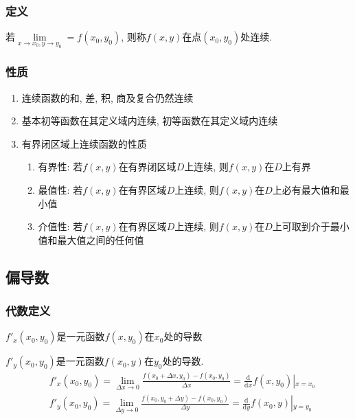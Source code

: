 \subsubsection{定义}
若$ \lim\limits_{x \rightarrow x_{0}, y\rightarrow y_{0}}=f(x_{0},y_{0}) $, 则称$ f(x,y) $在点$ (x_{0},y_{0}) $处连续.
\subsubsection{性质}
\begin{enumerate}
    \item 连续函数的和, 差, 积, 商及复合仍然连续
    \item 基本初等函数在其定义域内连续, 初等函数在其定义域内连续
    \item 有界闭区域上连续函数的性质
          \begin{enumerate}
              \item 有界性: 若$ f(x,y) $在有界闭区域$ D $上连续, 则$ f(x,y) $在$ D $上有界
              \item 最值性: 若$ f(x,y) $在有界区域$ D $上连续, 则$ f(x,y) $在$ D $上必有最大值和最小值
              \item 介值性: 若$ f(x,y) $在有界区域$ D $上连续, 则$ f(x,y) $在$ D $上可取到介于最小值和最大值之间的任何值
          \end{enumerate}
\end{enumerate}
\subsection{偏导数}
\subsubsection{代数定义}
$ f'_{x}(x_{0},y_{0}) $是一元函数$ f(x,y_{0}) $在$ x_{0} $处的导数 \par \vspace{.5em}
$ f'_{y}(x_{0},y_{0}) $是一元函数$ f(x_{0},y) $在$ y_{0} $处的导数.
\begin{equation*}
    \begin{aligned}
         & f'_{x}(x_{0},y_{0})=\lim\limits_{\Delta x \rightarrow 0}\frac{f(x_{0}+\Delta x,y_{0})-f(x_{0},y_{0})}{\Delta x}=\frac{\mathrm{d}}{\mathrm{d}x}f(x,y_{0})\left|_{x=x_{0}}\right. \\
         & f'_{y}(x_{0},y_{0})=\lim\limits_{\Delta y \rightarrow 0}\frac{f(x_{0},y_{0}+\Delta y)-f(x_{0},y_{0})}{\Delta y}=\frac{\mathrm{d}}{\mathrm{d}y}f(x_{0},y)\left|_{y=y_{0}}\right.
    \end{aligned}
\end{equation*}
